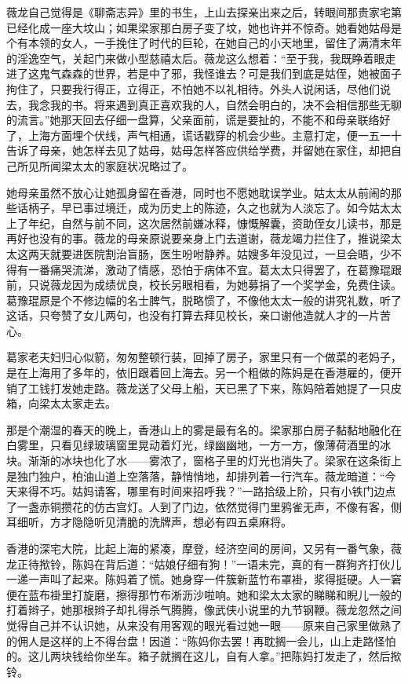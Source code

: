 \par 薇龙自己觉得是《聊斋志异》里的书生，上山去探亲出来之后，转眼间那贵家宅第已经化成一座大坟山；如果梁家那白房子变了坟，她也许并不惊奇。她看她姑母是个有本领的女人，一手挽住了时代的巨轮，在她自己的小天地里，留住了满清末年的淫逸空气，关起门来做小型慈禧太后。薇龙这么想着：“至于我，我既睁着眼走进了这鬼气森森的世界，若是中了邪，我怪谁去？可是我们到底是姑侄，她被面子拘住了，只要我行得正，立得正，不怕她不以礼相待。外头人说闲话，尽他们说去，我念我的书。将来遇到真正喜欢我的人，自然会明白的，决不会相信那些无聊的流言。”她那天回去仔细一盘算，父亲面前，谎是要扯的，不能不和母亲联络好了，上海方面埋个伏线，声气相通，谎话戳穿的机会少些。主意打定，便一五一十告诉了母亲，她怎样去见了姑母，姑母怎样答应供给学费，并留她在家住，却把自己所见所闻梁太太的家庭状况略过了。
\par 她母亲虽然不放心让她孤身留在香港，同时也不愿她耽误学业。姑太太从前闹的那些话柄子，早已事过境迁，成为历史上的陈迹，久之也就为人淡忘了。如今姑太太上了年纪，自然与前不同，这次居然前嫌冰释，慷慨解囊，资助侄女儿读书，那是再好也没有的事。薇龙的母亲原说要亲身上门去道谢，薇龙竭力拦住了，推说梁太太这两天就要进医院割治盲肠，医生吩咐静养。姑嫂多年没见过，一旦会晤，少不得有一番痛哭流涕，激动了情感，恐怕于病体不宜。葛太太只得罢了，在葛豫琨跟前，只说薇龙因为成绩优良，校长另眼相看，为她募捐了一个奖学金，免费住读。葛豫琨原是个不修边幅的名士脾气，脱略惯了，不像他太太一般的讲究礼数，听了这话，只夸赞了女儿两句，也没有打算去拜见校长，亲口谢他造就人才的一片苦心。
\par 葛家老夫妇归心似箭，匆匆整顿行装，回掉了房子，家里只有一个做菜的老妈子，是在上海用了多年的，依旧跟着回上海去。另一个粗做的陈妈是在香港雇的，便开销了工钱打发她走路。薇龙送了父母上船，天已黑了下来，陈妈陪着她提了一只皮箱，向梁太太家走去。
\par 那是个潮湿的春天的晚上，香港山上的雾是最有名的。梁家那白房子黏黏地融化在白雾里，只看见绿玻璃窗里晃动着灯光，绿幽幽地，一方一方，像薄荷酒里的冰块。渐渐的冰块也化了水——雾浓了，窗格子里的灯光也消失了。梁家在这条街上是独门独户，柏油山道上空落落，静悄悄地，却排列着一行汽车。薇龙暗道：“今天来得不巧。姑妈请客，哪里有时间来招呼我？”一路拾级上阶，只有小铁门边点了一盏赤铜攒花的仿古宫灯。人到了门边，依然觉得门里鸦雀无声，不像有客，侧耳细听，方才隐隐听见清脆的洗牌声，想必有四五桌麻将。
\par 香港的深宅大院，比起上海的紧凑，摩登，经济空间的房间，又另有一番气象，薇龙正待揿铃，陈妈在背后道：“姑娘仔细有狗！”一语未完，真的有一群狗齐打伙儿一递一声叫了起来。陈妈着了慌。她身穿一件簇新蓝竹布罩褂，浆得挺硬。人一窘便在蓝布褂里打旋磨，擦得那竹布淅沥沙啦响。她和梁太太家的睇睇和睨儿一般的打着辫子，她那根辫子却扎得杀气腾腾，像武侠小说里的九节钢鞭。薇龙忽然之间觉得自己并不认识她，从来没有用客观的眼光看过她一眼——原来自己家里做熟了的佣人是这样的上不得台盘！因道：“陈妈你去罢！再耽搁一会儿，山上走路怪怕的。这儿两块钱给你坐车。箱子就搁在这儿，自有人拿。”把陈妈打发走了，然后揿铃。
